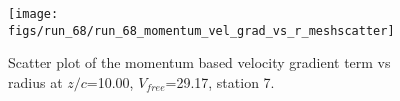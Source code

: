 \begin{figure}[H]
\centering
\texttt{[image: figs/run\_68/run\_68\_momentum\_vel\_grad\_vs\_r\_meshscatter]}
\caption{Scatter plot of the momentum based velocity gradient term vs radius at $z/c$=10.00, $V_{free}$=29.17, station 7.}
\label{fig:run_68_momentum_vel_grad_vs_r_meshscatter}
\end{figure}



